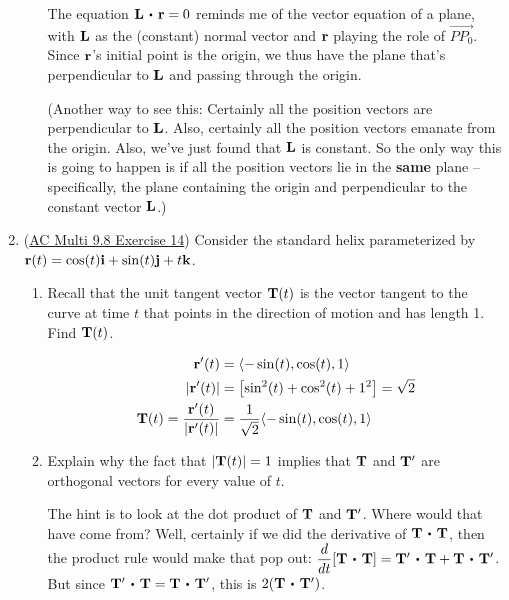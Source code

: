 \begin{enumerate}[leftmargin=0pt]
\begin{enumerate}
    \begin{red}
    The equation $\vL \dotp \vr = 0$ reminds me of the vector equation of a plane, with $\mathbf{L}$ as the (constant) normal vector and $\mathbf{r}$ playing the role of $\overrightarrow{PP_0}$. Since $\mathbf{r}$'s initial point is the origin, we thus have the plane that's perpendicular to $\mathbf{L}$ and passing through the origin.
    
    (Another way to see this: Certainly all the position vectors are perpendicular to $\mathbf{L}$. Also, certainly all the position vectors emanate from the origin. Also, we've just found that $\mathbf{L}$ is constant. So the only way this is going to happen is if all the position vectors lie in the \textbf{same} plane -- specifically, the plane containing the origin and perpendicular to the constant vector $\mathbf{L}$.)
    \end{red}
\end{enumerate}

\item (\href{https://activecalculus.org/multi/S-9-8-Arc-Length-Curvature.html#Ez_9_8_4}{AC Multi 9.8 Exercise 14}) Consider the standard helix parameterized by $\mathbf{r}(t) = \cos(t) \mathbf{i} + \sin(t) \mathbf{j} + t \mathbf{k}$.
\begin{enumerate}
    \item Recall that the unit tangent vector $\mathbf{T}(t)$ is the vector tangent to the curve at time $t$ that points in the direction of motion and has length 1. Find $\mathbf{T}(t)$.
    \begin{red}
        \begin{align*}
            \mathbf{r}'(t) &= \langle -\sin(t), \cos(t), 1 \rangle \\
            |\mathbf{r}'(t)| &= \left[\sin^2(t) + \cos^2(t) + 1^2\right] = \sqrt{2} \\
            \mathbf{T}(t) = \dfrac{\mathbf{r}'(t)}{|\mathbf{r}'(t)|} &= \dfrac{1}{\sqrt{2}} \langle -\sin(t), \cos(t), 1 \rangle
        \end{align*}
    \end{red}
    \item Explain why the fact that $|\mathbf{T}(t)|=1$ implies that $\mathbf{T}$ and $\mathbf{T}'$ are orthogonal vectors for every value of $t$. 

    \begin{red}
        The hint is to look at the dot product of $\mathbf{T}$ and $\mathbf{T}'$. Where would that have come from? Well, certainly if we did the derivative of $\vT \dotp \vT$, then the product rule would make that pop out:
        $\dfrac{d}{dt} [\vT\dotp\vT] = \vT' \dotp \vT + \vT \dotp \vT'$. But since $\vT' \dotp \vT = \vT \dotp \vT'$, this is $2(\vT\dotp \vT')$.


\end{red}
\end{enumerate}
\end{enumerate}

